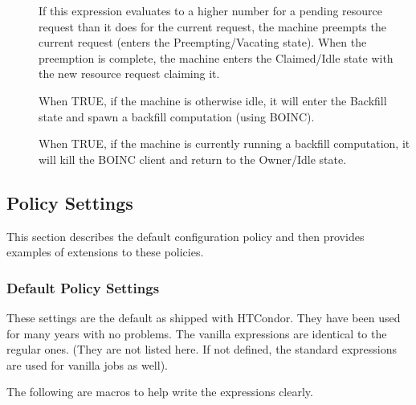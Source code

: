 \begin{description}
\item[] If this expression evaluates to a higher number for
  a pending resource request than it does for the current request, the
  machine preempts the current request (enters the
  Preempting/Vacating state).  When the preemption is complete, the
  machine enters the Claimed/Idle state with the new resource
  request claiming it.

\item[] When TRUE, if the machine is otherwise
  idle, it will enter the Backfill state and spawn a backfill
  computation (using BOINC).

\item[] When TRUE, if the machine is currently
  running a backfill computation, it will kill the BOINC client and
  return to the Owner/Idle state.

\end{description}

\subsection{\label{sec:Policy-Settings}Policy Settings}

This section describes the default configuration
policy and then provides examples of extensions to these
policies.

\subsubsection{\label{sec:Default-Policy}Default Policy Settings}

These settings are the default as shipped with HTCondor.  They have been
used for many years with no problems.  The vanilla expressions are
identical to the regular ones. (They are not listed here.  If
not defined, the standard expressions are used for vanilla jobs
as well).

The following are macros to help write the expressions
clearly.

